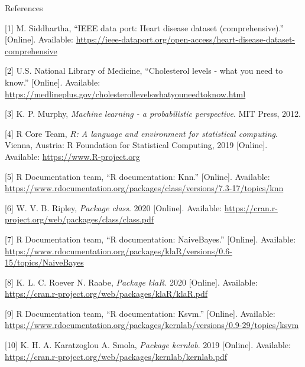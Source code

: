\documentclass[
  ignorenonframetext,
]{beamer}
\begin{document}
\begin{frame}{References}
\protect\hypertarget{references}{}

\hypertarget{refs}{}
\leavevmode\hypertarget{ref-ieeedataport}{}%
{[}1{]} M. Siddhartha, ``IEEE data port: Heart disease dataset
(comprehensive).'' {[}Online{]}. Available:
\url{https://ieee-dataport.org/open-access/heart-disease-dataset-comprehensive}

\leavevmode\hypertarget{ref-medline}{}%
{[}2{]} U.S. National Library of Medicine, ``Cholesterol levels - what
you need to know.'' {[}Online{]}. Available:
\url{https://medlineplus.gov/cholesterollevelswhatyouneedtoknow.html}

\leavevmode\hypertarget{ref-murphy}{}%
{[}3{]} K. P. Murphy, \emph{Machine learning - a probabilistic
perspective}. MIT Press, 2012.

\leavevmode\hypertarget{ref-rfoundations}{}%
{[}4{]} R Core Team, \emph{R: A language and environment for statistical
computing}. Vienna, Austria: R Foundation for Statistical Computing,
2019 {[}Online{]}. Available: \url{https://www.R-project.org}

\leavevmode\hypertarget{ref-rfunknn}{}%
{[}5{]} R Documentation team, ``R documentation: Knn.'' {[}Online{]}.
Available:
\url{https://www.rdocumentation.org/packages/class/versions/7.3-17/topics/knn}

\leavevmode\hypertarget{ref-rbibclass}{}%
{[}6{]} W. V. B. Ripley, \emph{Package class}. 2020 {[}Online{]}.
Available: \url{https://cran.r-project.org/web/packages/class/class.pdf}

\leavevmode\hypertarget{ref-rfunnaivebayes}{}%
{[}7{]} R Documentation team, ``R documentation: NaiveBayes.''
{[}Online{]}. Available:
\url{https://www.rdocumentation.org/packages/klaR/versions/0.6-15/topics/NaiveBayes}

\leavevmode\hypertarget{ref-rbibklar}{}%
{[}8{]} K. L. C. Roever N. Raabe, \emph{Package klaR}. 2020
{[}Online{]}. Available:
\url{https://cran.r-project.org/web/packages/klaR/klaR.pdf}

\leavevmode\hypertarget{ref-rfunkvsm}{}%
{[}9{]} R Documentation team, ``R documentation: Ksvm.'' {[}Online{]}.
Available:
\url{https://www.rdocumentation.org/packages/kernlab/versions/0.9-29/topics/ksvm}

\leavevmode\hypertarget{ref-rbibkernlab}{}%
{[}10{]} K. H. A. Karatzoglou A. Smola, \emph{Package kernlab}. 2019
{[}Online{]}. Available:
\url{https://cran.r-project.org/web/packages/kernlab/kernlab.pdf}


\end{frame}
\end{document}
